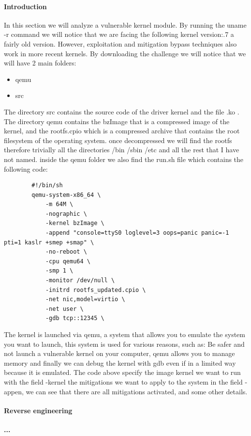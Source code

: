     \paragraph{Introduction}
    In this section we will analyze a vulnerable kernel module.\newline
    By running the uname -r command we will notice that we are facing the following kernel version:.7 a fairly old version.\newline
    However, exploitation and mitigation bypass techniques also work in more recent kernels.\newline
    By downloading the challenge we will notice that we will have 2 main folders:\newline
    \begin{itemize}
        \item qemu 
        \item src 
    \end{itemize}
    The directory src contains the source code of the driver kernel and the file .ko .\newline
    The directory qemu contains the bzImage that is a compressed image of the kernel, and the rootfs.cpio which is a compressed archive that contains the root filesystem of the operating system.\newline
    once decompressed we will find the rootfs therefore trivially all the directories /bin /sbin /etc and all the rest that I have not named. \newline
    inside the qemu folder we also find the run.sh file which contains the following code:\newline
    
    \begin{verbatim}
        #!/bin/sh
        qemu-system-x86_64 \
            -m 64M \
            -nographic \
            -kernel bzImage \
            -append "console=ttyS0 loglevel=3 oops=panic panic=-1 pti=1 kaslr +smep +smap" \
            -no-reboot \
            -cpu qemu64 \
            -smp 1 \
            -monitor /dev/null \
            -initrd rootfs_updated.cpio \
            -net nic,model=virtio \
            -net user \
            -gdb tcp::12345 \
    \end{verbatim}
    The kernel is launched via qemu, a system that allows you to emulate the system you want to launch, this system is used for various reasons, such as:\newline
    Be safer and not launch a vulnerable kernel on your computer, qemu allows you to manage memory and finally we can debug the kernel with gdb even if in a limited way because it is emulated.\newline
    The code above specify the image kernel we want to run with the field -kernel the mitigations we want to apply to the system in the field -appen, we can see that there are all mitigations activated, and some other details.\newline
    
    \paragraph{Reverse engineering}
    \paragraph{...}
